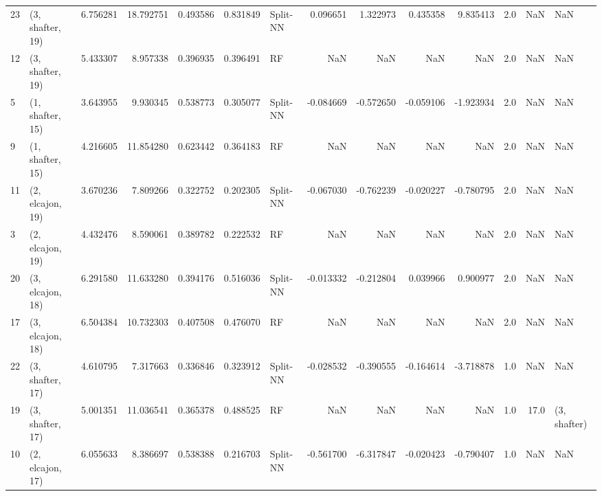 \begin{tabular}{llrrrrlrrrrrrl}
23 &  (3, shafter, 19) &   6.756281 &  18.792751 &   0.493586 &  0.831849 &    Split-NN &        0.096651 &      1.322973 &       0.435358 &     9.835413 &            2.0 &    NaN &              NaN \\
12 &  (3, shafter, 19) &   5.433307 &   8.957338 &   0.396935 &  0.396491 &          RF &             NaN &           NaN &            NaN &          NaN &            2.0 &    NaN &              NaN \\
5  &  (1, shafter, 15) &   3.643955 &   9.930345 &   0.538773 &  0.305077 &    Split-NN &       -0.084669 &     -0.572650 &      -0.059106 &    -1.923934 &            2.0 &    NaN &              NaN \\
9  &  (1, shafter, 15) &   4.216605 &  11.854280 &   0.623442 &  0.364183 &          RF &             NaN &           NaN &            NaN &          NaN &            2.0 &    NaN &              NaN \\
11 &  (2, elcajon, 19) &   3.670236 &   7.809266 &   0.322752 &  0.202305 &    Split-NN &       -0.067030 &     -0.762239 &      -0.020227 &    -0.780795 &            2.0 &    NaN &              NaN \\
3  &  (2, elcajon, 19) &   4.432476 &   8.590061 &   0.389782 &  0.222532 &          RF &             NaN &           NaN &            NaN &          NaN &            2.0 &    NaN &              NaN \\
20 &  (3, elcajon, 18) &   6.291580 &  11.633280 &   0.394176 &  0.516036 &    Split-NN &       -0.013332 &     -0.212804 &       0.039966 &     0.900977 &            2.0 &    NaN &              NaN \\
17 &  (3, elcajon, 18) &   6.504384 &  10.732303 &   0.407508 &  0.476070 &          RF &             NaN &           NaN &            NaN &          NaN &            2.0 &    NaN &              NaN \\
22 &  (3, shafter, 17) &   4.610795 &   7.317663 &   0.336846 &  0.323912 &    Split-NN &       -0.028532 &     -0.390555 &      -0.164614 &    -3.718878 &            1.0 &    NaN &              NaN \\
19 &  (3, shafter, 17) &   5.001351 &  11.036541 &   0.365378 &  0.488525 &          RF &             NaN &           NaN &            NaN &          NaN &            1.0 &   17.0 &     (3, shafter) \\
10 &  (2, elcajon, 17) &   6.055633 &   8.386697 &   0.538388 &  0.216703 &    Split-NN &       -0.561700 &     -6.317847 &      -0.020423 &    -0.790407 &            1.0 &    NaN &              NaN \\

\end{tabular}
